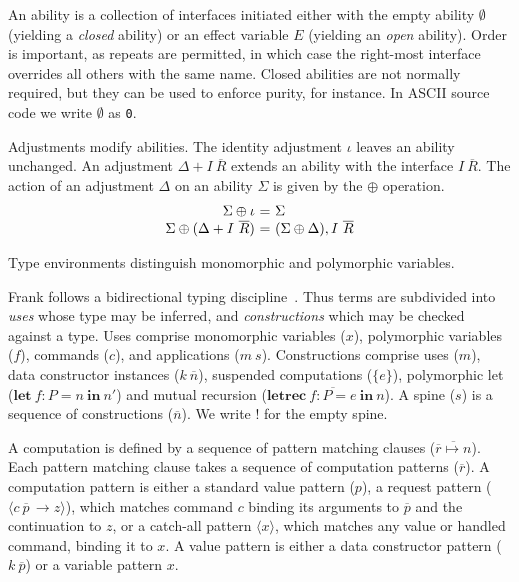 \documentclass{sigplanconf}
\makeatletter
\newcommand{\many}{\overline}
\newcommand\ba{\begin{array}}
\newcommand\ea{\end{array}}
\newenvironment{equations}{\[\ba{@{}r@{~}c@{~}l@{}}}{\ea\]\ignorespacesafterend}
\newcommand{\sig}{I}
\newcommand{\sigs}{\Sigma}
\newcommand{\key}[1]{\mathbf{#1}} %
\newcommand{\handleSymbol}{\rightarrow}
\newcommand{\handle}[2]{{#1} \handleSymbol {#2}}
\newcommand{\thunk}[1]{\{{#1}\}}
\newcommand{\adj}{\Delta}
\newcommand{\ev}{E}
\newcommand{\effin}[1]{\langle {#1} \rangle}
\newcommand{\id}{\iota}
\makeatother
\begin{document}
An ability is a collection of interfaces initiated either with the
empty ability $\emptyset$ (yielding a \emph{closed} ability) or an
effect variable $\ev$ (yielding an \emph{open} ability). Order is
important, as repeats are permitted, in which case the right-most
interface overrides all others with the same name.
%
Closed abilities are not normally required, but they can be used to
enforce purity, for instance. In ASCII source code we write
$\emptyset$ as \verb!0!.

Adjustments modify abilities. The identity adjustment $\id$ leaves an
ability unchanged. An adjustment $\adj + \sig~\many{R}$ extends an
ability with the interface $\sig~\many{R}$. The action of an
adjustment $\Delta$ on an ability $\sigs$ is given by the $\oplus$
operation.
%
\begin{equations}
\sigs \oplus \id                    &=& \sigs \\
\sigs \oplus (\adj + \sig~\many{R}) &=& (\sigs \oplus \adj), \sig~\many{R} \\
\end{equations}
%

Type environments distinguish monomorphic and polymorphic variables.

Frank follows a bidirectional typing discipline~\cite{PierceT00}. Thus
terms are subdivided into \emph{uses} whose type may be inferred, and
\emph{constructions} which may be checked against a type. Uses
comprise monomorphic variables ($x$), polymorphic variables ($f$),
commands ($c$), and applications ($m~s$). Constructions comprise uses
($m$), data constructor instances ($k~\many{n}$), suspended
computations ($\thunk{e}$), polymorphic let ($\key{let}~f : P =
n~\key{in}~n'$) and mutual recursion ($\key{letrec}~\many{f : P =
  e}~\key{in}~n$).
%
A spine ($s$) is a sequence of constructions ($\many{n}$). We write
$!$ for the empty spine.

A computation is defined by a sequence of pattern matching clauses
($\many{\many{r} \mapsto n}$).
%
Each pattern matching clause takes a sequence of computation patterns
($\many{r}$). A computation pattern is either a standard value pattern
($p$), a request pattern ($\effin{\handle{c~\many{p}\,}{z}}$), which
matches command $c$ binding its arguments to $\many{p}$ and the
continuation to $z$, or a catch-all pattern $\effin{x}$, which matches
any value or handled command, binding it to $x$.
%
A value pattern is either a data constructor pattern ($k~\many{p}$) or
a variable pattern $x$.
\end{document}
